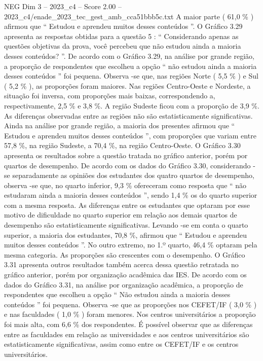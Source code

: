 \begin{textsample}{NEG Dim 3 – 2023\_c4 – Score 2.00 – 2023\_c4/enade\_2023\_tec\_gest\_amb\_cca51bbb5c.txt}
A maior parte ( 61,0 \% ) afirmou que “ Estudou e aprendeu muitos desses conteúdos ”.
O Gráfico 3.29 apresenta as respostas obtidas para a questão 5 : “ Considerando apenas as questões objetivas da prova, você percebeu que não estudou ainda a maioria desses conteúdos? ”.
De acordo com o Gráfico 3.29, na análise por grande região, a proporção de respondentes que escolheu a opção “ não estudou ainda a maioria desses conteúdos ” foi pequena.
Observa -se que, nas regiões Norte ( 5,5 \% ) e Sul ( 5,2 \% ), as proporções foram maiores.
Nas regiões Centro-Oeste e Nordeste, a situação foi inversa, com proporções mais baixas, correspondendo a, respectivamente, 2,5 \% e 3,8 \%.
A região Sudeste ficou com a proporção de 3,9 \%.
As diferenças observadas entre as regiões não são estatisticamente significativas.
Ainda na análise por grande região, a maioria dos presentes afirmou que “ Estudou e aprendeu muitos desses conteúdos ”, com proporções que variam entre 57,8 \%, na região Sudeste, a 70,4 \%, na região Centro-Oeste.
O Gráfico 3.30 apresenta os resultados sobre a questão tratada no gráfico anterior, porém por quartos de desempenho.
De acordo com os dados do Gráfico 3.30, considerando -se separadamente as opiniões dos estudantes dos quatro quartos de desempenho, observa -se que, no quarto inferior, 9,3 \% ofereceram como resposta que “ não estudaram ainda a maioria desses conteúdos ”, sendo 1,4 \% os do quarto superior com a mesma resposta.
As diferenças entre os estudantes que optaram por esse motivo de dificuldade no quarto superior em relação aos demais quartos de desempenho são estatisticamente significativas.
Levando -se em conta o quarto superior, a maioria dos estudantes, 70,8 \%, afirmou que “ Estudou e aprendeu muitos desses conteúdos ”.
No outro extremo, no 1.º quarto, 46,4 \% optaram pela mesma categoria.
As proporções são crescentes com o desempenho.
O Gráfico 3.31 apresenta outros resultados também acerca dessa questão retratada no gráfico anterior, porém por organização acadêmica das IES.
De acordo com os dados do Gráfico 3.31, na análise por organização acadêmica, a proporção de respondentes que escolheu a opção “ Não estudou ainda a maioria desses conteúdos ” foi pequena.
Observa -se que as proporções nos CEFET/IF ( 3,0 \% ) e nas faculdades ( 1,0 \% ) foram menores.
Nos centros universitários a proporção foi mais alta, com 6,6 \% dos respondentes.
É possível observar que as diferenças entre as faculdades em relação as universidades e aos centros universitários são estatisticamente significativas, assim como entre os CEFET/IF e os centros universitários.

\end{textsample}
